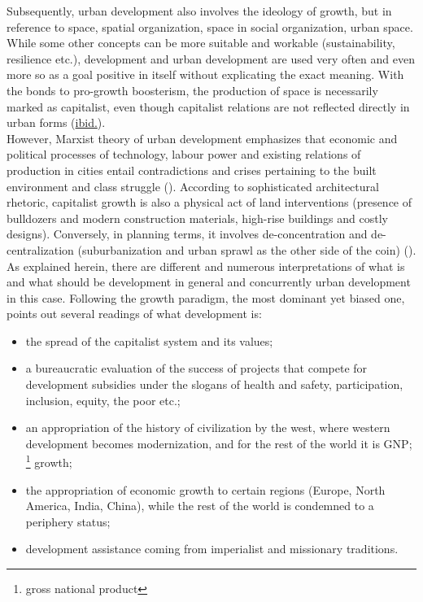 \documentclass[11pt]{report}
\begin{document}
{{Subsequently, urban development also involves the ideology of growth, but in reference to space, spatial organization, space in social organization, urban space.
While some other concepts can be more suitable and workable (sustainability, resilience etc.), development and urban development are used very often and even more so as a goal positive in itself without explicating the exact meaning.
With the bonds to pro-growth boosterism, the production of space is necessarily marked as capitalist, even though capitalist relations are not reflected directly in urban forms (\href{Gottdiener}{ibid.}). 
\\

However, Marxist theory of urban development emphasizes that economic and political processes of technology, labour power and existing relations of production in cities entail contradictions and crises pertaining to the built environment and class struggle (\href{Harvey}{\citealt{harvey_urban_1978}}).
According to sophisticated architectural rhetoric, capitalist growth is also a physical act of land interventions (presence of bulldozers and modern construction materials, high-rise buildings and costly designs).
Conversely, in planning terms, it involves de-concentration and de-centralization (suburbanization and urban sprawl as the other side of the coin) (\href{Gottdiener}{\citealt{gottdiener_social_2010}}).
\\

As explained herein, there are different and numerous interpretations of what is and what should be development in general and concurrently urban development in this case.
Following the growth paradigm, the most dominant yet biased one, \href{Galtung}{\cite{galtung_peace_1996}}
points out several readings of what development is:

\begin{itemize}
\item the spread of the capitalist system and its values;
\item a bureaucratic evaluation of the success of projects that compete for development subsidies under the slogans of health and safety, participation, inclusion, equity, the poor etc.;
\item an appropriation of the history of civilization by the west, where western development becomes modernization, and for the rest of the world it is GNP;
\footnote{gross national product}
growth; 
\item the appropriation of economic growth to certain regions (Europe, North America, India, China), while the rest of the world is condemned to a periphery status;
\item development assistance coming from imperialist and missionary traditions.
\end{itemize}

}}
\end{document}
